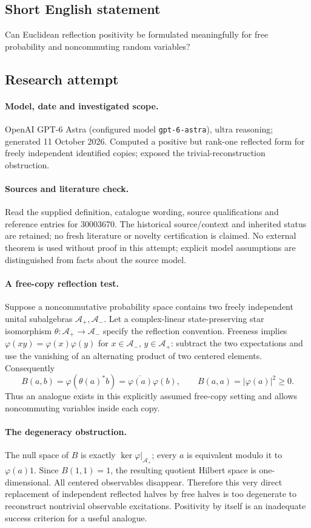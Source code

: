 \documentclass[11pt]{article}
\begin{document}
\subsection{Short English statement}
Can Euclidean reflection positivity be formulated meaningfully for free probability and noncommuting random variables?
\subsection{Research attempt}
\paragraph{Model, date and investigated scope.}
OpenAI GPT-6 Astra (configured model \texttt{gpt-6-astra}), ultra reasoning; generated 11 October 2026. Computed a positive but rank-one reflected form for freely independent identified copies; exposed the trivial-reconstruction obstruction.

\paragraph{Sources and literature check.}
Read the supplied definition, catalogue wording, source qualifications and reference entries for 30003670. The historical source/context and inherited status are retained; no fresh literature or novelty certification is claimed. No external theorem is used without proof in this attempt; explicit model assumptions are distinguished from facts about the source model.

\paragraph{A free-copy reflection test.} Suppose a noncommutative probability space contains two freely independent unital subalgebras \(\mathcal A_+,\mathcal A_-\). Let a complex-linear state-preserving star isomorphism \(\theta:\mathcal A_+\to\mathcal A_-\) specify the reflection convention. Freeness implies \(\varphi(xy)=\varphi(x)\varphi(y)\) for \(x\in\mathcal A_-\), \(y\in\mathcal A_+\): subtract the two expectations and use the vanishing of an alternating product of two centered elements. Consequently
\[
 B(a,b)=\varphi(\theta(a)^*b)=\overline{\varphi(a)}\varphi(b),\qquad
 B(a,a)=|\varphi(a)|^2\ge0.
\]
Thus an analogue exists in this explicitly assumed free-copy setting and allows noncommuting variables inside each copy.
\paragraph{The degeneracy obstruction.} The null space of \(B\) is exactly \(\ker\varphi|_{\mathcal A_+}\); every \(a\) is equivalent modulo it to \(\varphi(a)1\). Since \(B(1,1)=1\), the resulting quotient Hilbert space is one-dimensional. All centered observables disappear. Therefore this very direct replacement of independent reflected halves by free halves is too degenerate to reconstruct nontrivial observable excitations. Positivity by itself is an inadequate success criterion for a useful analogue.
\end{document}
